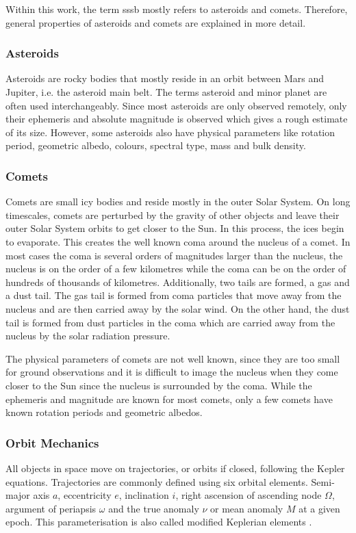 Within this work, the term \gls{sssb} mostly refers to asteroids and comets. Therefore, general properties of asteroids and comets are explained in more detail.

\subsubsection{Asteroids}
Asteroids are rocky bodies that mostly reside in an orbit between Mars and Jupiter, i.e. the asteroid main belt. The terms asteroid and minor planet are often used interchangeably. Since most asteroids are only observed remotely, only their ephemeris and absolute magnitude is observed which gives a rough estimate of its size. However, some asteroids also have physical parameters like rotation period, geometric albedo, colours, spectral type, mass and bulk density.

\subsubsection{Comets}
Comets are small icy bodies and reside mostly in the outer Solar System. On long timescales, comets are perturbed by the gravity of other objects and leave their outer Solar System orbits to get closer to the Sun. In this process, the ices begin to evaporate. This creates the well known coma around the nucleus of a comet. In most cases the coma is several orders of magnitudes larger than the nucleus, the nucleus is on the order of a few kilometres while the coma can be on the order of hundreds of thousands of kilometres. Additionally, two tails are formed, a gas and a dust tail. The gas tail is formed from coma particles that move away from the nucleus and are then carried away by the solar wind. On the other hand, the dust tail is formed from dust particles in the coma which are carried away from the nucleus by the solar radiation pressure.

The physical parameters of comets are not well known, since they are too small for ground observations and it is difficult to image the nucleus when they come closer to the Sun since the nucleus is surrounded by the coma. While the ephemeris and magnitude are known for most comets, only a few comets have known rotation periods and geometric albedos.

\subsubsection{Orbit Mechanics}
All objects in space move on trajectories, or orbits if closed, following the Kepler equations. Trajectories are commonly defined using six orbital elements.
Semi-major axis $a$, eccentricity $e$, inclination $i$, right ascension of ascending node $\Omega$, argument of periapsis $\omega$ and the true anomaly $\nu$ or mean anomaly $M$ at a given epoch. This parameterisation is also called modified Keplerian elements \cite{Hintz2015FundamentalsAstrodynamics}.

